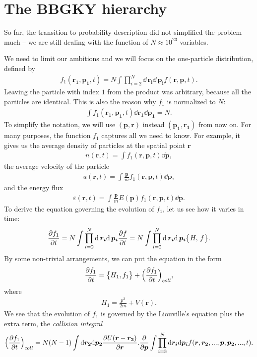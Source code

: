 \section{The BBGKY hierarchy}
So far, the transition to probability description did not simplified the problem much -- we are still dealing with the function of $N \approx 10^{23}$ variables.

We need to limit our ambitions and we will focus on the one-particle distribution, defined by
\begin{align} \label{1pd}
f_1(\bm{r_1},\bm{p_1},t) = N \int \prod_{i=2}^N \dd \, \bm{r_i} \dd \, \bm{p_i}
 f(\bm{r},\bm{p},t).
\end{align}
Leaving the particle with index $1$ from the product was arbitrary, because all the particles are identical. This is also the reason why $f_1$ is normalized to $N$:
\begin{align*}
\int f_1(\bm{r_1},\bm{p_1},t) \dd \bm{r_1} \dd \bm{p_1} = N.
\end{align*}
To simplify the notation, we will use $(\bm{p},\bm{r})$ instead $(\bm{p_1},\bm{r_1})$ from now on.
For many purposes, the function $f_1$ captures all we need to know.
For example, it gives us the average density of particles at the spatial point $\bm{r}$
\begin{align} \label{partdens}
n(\bm{r},t) = \int f_1(\bm{r},\bm{p},t) \dd \bm{p},
\end{align}
the average velocity of the particle
\begin{align*}
u(\bm{r},t) = \int \frac{\bm{p}}{m} f_1(\bm{r},\bm{p},t) \dd \bm{p},
\end{align*}
and the energy flux
\begin{align*}
\varepsilon(\bm{r},t) = \int \frac{\bm{p}}{m} E(\bm{p}) f_1(\bm{r},\bm{p},t) \dd \bm{p}.
\end{align*}
To derive the equation governing the evolution of $f_1$, let us see how it varies in time:
\begin{align*}
\frac{\partial f_1}{\partial t} = N \int \prod_{i=2}^N \mathrm{d} \, \bm{r_i} \mathrm{d} \, \bm{p_i} \frac{\partial f}{\partial t} = N \int \prod_{i=2}^N \mathrm{d} \, \bm{r_i} \mathrm{d} \, \bm{p_i} \big\{ H, \, f \big\}.
\end{align*}
By some non-trivial arrangements, we can put the equation in the form
\begin{align} \label{boltzman}
\frac{\partial f_1}{\partial t} = \big\{ H_1, f_1 \big\} + \Big(\frac{\partial f_1}{\partial t} \Big)_{coll},
\end{align}
where
\begin{align*}
H_1 = \frac{p^2}{2m} + V(\bm{r}).
\end{align*}
We see that the evolution of $f_1$ is governed by the Liouville's equation plus the extra term, the \textit{collision integral}
\begin{align*}
\Big(\frac{\partial f_1}{\partial t} \Big)_{coll} = N(N-1) \int \mathrm{d} \bm{r_2} \mathrm{d} \bm{p_2} 
\frac{\partial U(\bm{r} - \bm{r_2})}{\partial \bm{r}} . \frac{\partial}{\partial \bm{p}} \int \prod_{i=3}^N \mathrm{d} \bm{r_i} \mathrm{d}\bm{p_i} f(\bm{r},\bm{r_2},...,\bm{p},\bm{p_2},...,t).
\end{align*}

